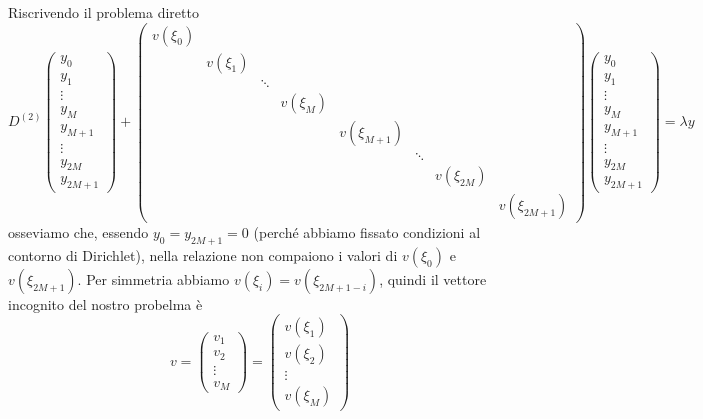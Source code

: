 \documentclass[a4paper,10pt]{article}
\theoremstyle{plain}
\theoremstyle{definition}
\theoremstyle{remark}
\begin{document}
Riscrivendo il problema diretto
\begin{equation*}
  D^{(2)} \begin{pmatrix}
    y_0 \\
    y_1 \\
    \vdots \\
    y_M \\
    y_{M+1} \\
    \vdots \\
    y _{2M} \\
    y _{2M+1} 
  \end{pmatrix} 
 + \begin{pmatrix}
    v(\xi _0) \\
    & v(\xi _1) \\
    & & \ddots  \\
    & & & v(\xi _M) \\
    & & & & v(\xi _{M+1}) \\
    & & & & & \ddots \\
    & & & & & & v( \xi _ {2M} ) \\
    & & & & & & & v(\xi _{2M+1}) 
    \end{pmatrix}
    \begin{pmatrix}
    y_0 \\
    y_1 \\
    \vdots \\
    y_M \\
    y_{M+1} \\
    \vdots \\
    y _{2M} \\
    y _{2M+1} 
  \end{pmatrix}
  = \lambda y
\end{equation*}
osseviamo che, essendo $y_0 = y_{2M+1} = 0$ (perché abbiamo fissato
condizioni al contorno di Dirichlet), nella relazione non compaiono i
valori di $v(\xi _0)$ e $v(\xi _{2M+1})$. Per simmetria abbiamo $v(\xi
_i) = v(\xi _{2M+1-i})$, quindi il vettore incognito del nostro
probelma è
\[
v = 
\begin{pmatrix}
  v_1 \\
  v_2 \\
  \vdots \\
  v_M 
\end{pmatrix}
=
\begin{pmatrix}
  v(\xi _1) \\
  v(\xi _2) \\
  \vdots \\
  v(\xi _M )
\end{pmatrix}
\]
\end{document}
